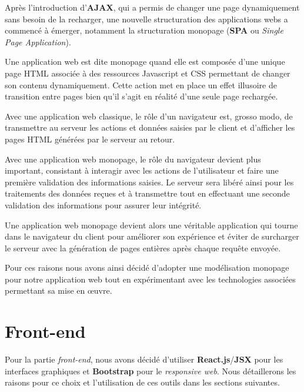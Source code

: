 \documentclass[a4paper,12pt]{report}
\theoremstyle{break}
\theoremstyle{break}
\theoremstyle{break}
\theoremstyle{break}
\theoremstyle{definition}
\theoremstyle{remark}
\begin{document}
Après l'introduction d'\textbf{AJAX}, qui a permis de changer une page dynamiquement sans besoin de la recharger, une nouvelle structuration des applications webs a commencé à émerger, notamment la structuration monopage (\textbf{SPA} ou \textit{Single Page Application}).

Une application web est dite monopage quand elle est composée d'une unique page HTML associée à des ressources Javascript et CSS permettant de changer son contenu dynamiquement. Cette action met en place un effet illusoire de transition entre pages bien qu'il s'agit en réalité d'une seule page rechargée.

Avec une application web classique, le rôle d'un navigateur est, grosso modo, de transmettre au serveur les actions et données saisies par le client et d'afficher les pages HTML générées par le serveur au retour.

Avec une application web monopage, le rôle du navigateur devient plus important, consistant à interagir avec les actions de l'utilisateur et faire une première validation des informations saisies. Le serveur sera libéré ainsi pour les traitements des données reçues et à transmettre tout en effectuant une seconde validation des informations pour assurer leur intégrité.

Une application web monopage devient alors une véritable \og application \fg qui tourne dans le navigateur du client pour améliorer son expérience et
éviter de surcharger le serveur avec la génération de pages entières après chaque requête envoyée.

Pour ces raisons nous avons ainsi décidé d'adopter une modélisation monopage pour notre application web tout en expérimentant avec les technologies associées permettant sa mise en \oe{}uvre.
\section{Front-end}
Pour la partie \textit{front-end}, nous avons décidé d'utiliser \textbf{React.js}/\textbf{JSX} pour les interfaces graphiques et \textbf{Bootstrap} pour le \textit{responsive web}. Nous détaillerons les raisons pour ce choix et l'utilisation de ces outils dans les sections suivantes.
\end{document}
